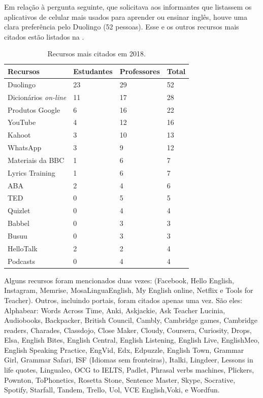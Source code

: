 \documentclass[portuguese]{textolivre}
\begin{document}
Em relação à pergunta seguinte, que solicitava aos informantes que listassem os aplicativos de celular mais usados para aprender ou ensinar inglês, houve uma clara preferência pelo Duolingo (52 pessoas). Esse e os outros recursos mais citados estão listados na .

\begin{table}[htpb]
\caption{Recursos mais citados em 2018.}
\label{tbl01}
\begin{tabularx}{\linewidth}{XXXX}
\toprule 
\textbf{Recursos}  & \textbf{Estudantes} & \textbf{Professores} & \textbf{Total} \\ 
\midrule
Duolingo & 23 & 29 & 52 \\
Dicionários \textit{on-line} & 11 & 17 & 28 \\
Produtos Google & 6 & 16 & 22 \\
YouTube & 4 & 12 & 16 \\
Kahoot & 3 & 10 & 13 \\
WhatsApp & 3 & 9 & 12 \\
Materiais da BBC & 1 & 6 & 7 \\
Lyrics Training & 1 & 6 & 7 \\
ABA & 2 & 4 & 6 \\
TED & 0 & 5 & 5 \\
Quizlet & 0 & 4 & 4 \\
Babbel & 0 & 3 & 3 \\
Busuu & 0 & 3 & 3 \\
HelloTalk & 2 & 2 & 4 \\
Podcasts & 0 & 4 & 4 \\
\bottomrule
\end{tabularx}
\end{table}

Alguns recursos foram mencionados duas vezes: (Facebook, Hello English, Instagram, Memrise, MosaLinguaEnglish, My English online, Netflix e Tools for Teacher). Outros, incluindo portais, foram citados apenas uma vez. São eles: Alphabear: Words Across Time, Anki, Askjackie, Ask Teacher Lucinia, Audiobooks, Backpacker, British Council, Cambly, Cambridge games, Cambridge readers, Charades, Classdojo, Close Maker, Cloudy, Coursera, Curiosity, Drops, Elsa, English Bites, English Central, English Listening, English Live, EnglishMeo, English Speaking Practice, EngVid, Edx, Edpuzzle, English Town, Grammar Girl, Grammar Safari, ISF (Idiomas sem fronteiras), Italki, Lingdeer, Lessons in life quotes, Lingualeo, OCG to IELTS, Padlet, Phrasal verbs machines, Plickers, Pownton, ToPhonetics, Rosetta Stone, Sentence Master, Skype, Socrative, Spotify, Starfall, Tandem, Trello, Uol, VCE English,Voki, e Wordfun.
\end{document}
